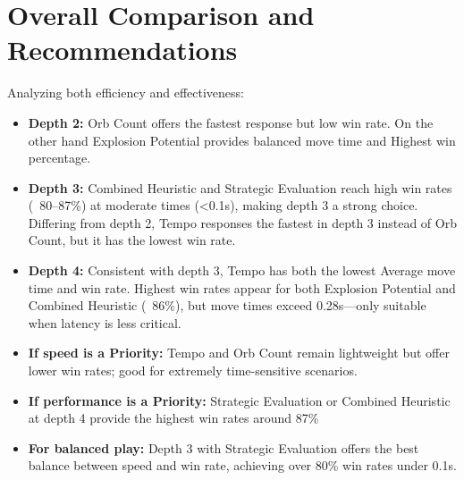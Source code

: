 \documentclass[12pt]{article}
\begin{document}
\newpage
\section{Overall Comparison and Recommendations}
Analyzing both efficiency and effectiveness:
\begin{itemize}
  \item \textbf{Depth 2:} Orb Count offers the fastest response but low win rate. On the other hand Explosion Potential provides balanced move time and Highest win percentage.
  \item \textbf{Depth 3:} Combined Heuristic and Strategic Evaluation reach high win rates (~80--87\%) at moderate times (<0.1s), making depth 3 a strong choice. 
    Differing from depth 2, Tempo responses the fastest in depth 3 instead of Orb Count, but it has the lowest win rate.
  \item \textbf{Depth 4:} Consistent with depth 3, Tempo has both the lowest Average move time and win rate. 
  Highest win rates appear for both Explosion Potential and Combined Heuristic (~86\%), but move times exceed 0.28s—only suitable when latency is less critical.
  \item \textbf{If speed is a Priority:} Tempo and Orb Count remain lightweight but offer lower win rates; good for extremely time-sensitive scenarios.
  \item \textbf{If performance is a Priority:} Strategic Evaluation or Combined Heuristic at depth 4 provide the highest win rates around 87\%
  \item \textbf{For balanced play:} Depth 3 with Strategic Evaluation offers the best balance between speed and win rate, achieving over 80\% win rates under 0.1s.
\end{itemize}
\end{document}
